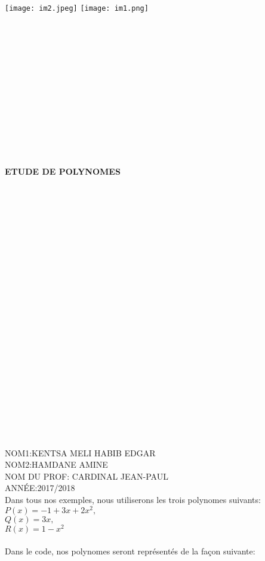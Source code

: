 \documentclass{exam}
\begin{document}
\texttt{[image: im2.jpeg]}
\indent \indent \indent \indent \indent \indent\texttt{[image: im1.png]}\\\\\\\\\\\\\\\\\\\\\\\\\\\\
\indent \indent\indent \indent \indent \indent\indent \indent \indent \indent \textbf{ETUDE DE POLYNOMES}\\\\\\\\\\\\\\\\\\\\\\\\\\\\\\\\\\\\\\\\\\\\\\\\



\noindent NOM1:KENTSA MELI HABIB EDGAR\\
NOM2:HAMDANE AMINE\\
NOM DU PROF: CARDINAL JEAN-PAUL\\
ANNÉE:2017/2018\\



\indent Dans tous nos exemples, nous utiliserons les trois polynomes suivants:\\
$P(x) = -1 + 3x + 2x^2,$\\
$Q(x) = 3x,$\\
$R(x) = 1-x^2$\\\\
Dans le code, nos polynomes seront représentés de la façon suivante:\\\\
\end{document}
